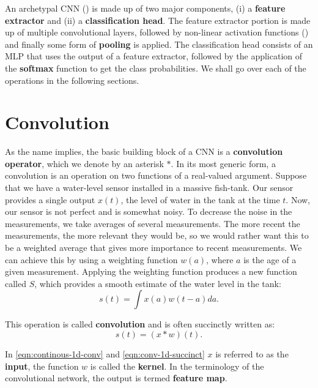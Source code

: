 An archetypal CNN () is made up of two major components, (i) a \textbf{feature extractor} and (ii) a \textbf{classification head}. The feature extractor portion is made up of multiple convolutional layers, followed by non-linear activation functions () and finally some form of \textbf{pooling} is applied.
The classification head consists of an MLP that uses the output of a feature extractor, followed by the application of the \textbf{softmax} function to get the class probabilities. We shall go over each of the operations in the following sections.


\section{Convolution}\label{sec:convolutions}

As the name implies, the basic building block of a CNN is a \textbf{convolution operator}, which we denote by an asterisk $\ast$. In its most generic form, a convolution is an operation on two functions of a real-valued argument. Suppose that we have a water-level sensor installed in a massive fish-tank. Our sensor provides a single output $x(t)$, the level of water in the tank at the time $t$. Now, our sensor is not perfect and is somewhat noisy. 
To decrease the noise in the measurements, we take averages of several measurements. The more recent the measurements, the more relevant they would be, so we would rather want this to be a weighted average that gives more importance to recent measurements.
We can achieve this by using a weighting function $w(a)$, where $a$ is the age of a given measurement. Applying the weighting function produces a new function called $S$, which provides a smooth estimate of the water level in the tank:
\begin{equation}
    \label{eqn:continous-1d-conv}
    s(t)=\int x(a) w(t-a) d a .
\end{equation}

This operation is called \textbf{convolution} and  is often succinctly written as:
\begin{equation}
    \label{eqn:conv-1d-succinct}
    s(t) = (x \ast w)(t).
\end{equation}

In \cref{eqn:continous-1d-conv} and \cref{eqn:conv-1d-succinct} $x$ is referred to as the \textbf{input}, the function $w$ is called the \textbf{kernel}. In the terminology of the convolutional network, the output is termed \textbf{feature map}.

